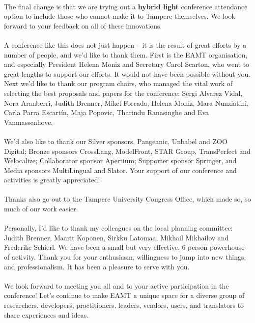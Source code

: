 \documentclass[a4paper,11pt,twoside]{book}
\begin{document}
\begin{onehalfspacing}
\\
\noindent
The final change is that we are trying out a \textbf{hybrid light} conference attendance option to include those who cannot make it to Tampere themselves. We look forward to your feedback on all of these innovations.\\
\\
\clearpage
\noindent
A conference like this does not just happen – it is the result of great efforts by a number of people, and we’d like to thank them. First is the EAMT organisation, and especially President Helena Moniz and Secretary Carol Scarton, who went to great lengths to support our efforts. It would not have been possible without you. Next we’d like to thank our program chairs, who managed the vital work of selecting the best proposals and papers for the conference: Sergi Alvarez Vidal, Nora Aranberri, Judith Brenner, Mikel Forcada, Helena Moniz, Mara Nunziatini, Carla Parra Escartín, Maja Popovic, Tharindu Ranasinghe and Eva Vanmassenhove.\\  
\\
\noindent
We’d also like to thank our Silver sponsors, Pangeanic, Unbabel and ZOO Digital; Bronze sponsors CrossLang, ModelFront, STAR Group, TransPerfect and Welocalize; Collaborator sponsor Apertium; Supporter sponsor Springer, and Media sponsors MultiLingual and Slator. Your support of our conference and activities is greatly appreciated!\\
\\
\noindent
Thanks also go out to the Tampere University Congress Office, which made so, so much of our work easier.\\
\\
\noindent
Personally, I’d like to thank my colleagues on the local planning committee: Judith Brenner, Maarit Koponen, Sirkku Latomaa, Mikhail Mikhailov and Frederike Schierl. We have been a small but very effective, 6-person powerhouse of activity. Thank you for your enthusiasm, willingness to jump into new things, and professionalism. It has been a pleasure to serve with you.\\
\\
\noindent
We look forward to meeting you all and to your active participation in the conference! Let’s continue to make EAMT a unique space for a diverse group of researchers, developers, practitioners, leaders, vendors, users, and translators to share experiences and ideas.\\

\vspace{1cm}


\end{onehalfspacing}
\end{document}

